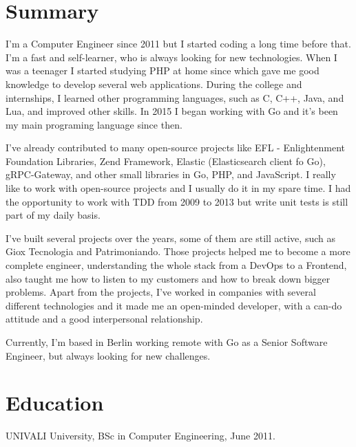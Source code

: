 \documentclass[margin]{res}
\begin{document}
\address{Berlin, DE \\ xguiga@gmail.com \\ +49 (173) 979-9383}

\begin{resume}

\section{Summary}
I'm a Computer Engineer since 2011 but I started coding a long time before that. I'm a fast and self-learner, who is always looking for new technologies. When I was a teenager I started studying PHP at home since which gave me good knowledge to develop several web applications. During the college and internships, I learned other programming languages, such as C, C++, Java, and Lua, and improved other skills. In 2015 I began working with Go and it's been my main programing language since then.

I've already contributed to many open-source projects like EFL - Enlightenment Foundation Libraries, Zend Framework, Elastic (Elasticsearch client fo Go), gRPC-Gateway, and other small libraries in Go, PHP, and JavaScript. I really like to work with open-source projects and I usually do it in my spare time. I had the opportunity to work with TDD from 2009 to 2013 but write unit tests is still part of my daily basis.

I've built several projects over the years, some of them are still active, such as Giox Tecnologia and Patrimoniando. Those projects helped me to become a more complete engineer, understanding the whole stack from a DevOps to a Frontend, also taught me how to listen to my customers and how to break down bigger problems. Apart from the projects, I've worked in companies with several different technologies and it made me an open-minded developer, with a can-do attitude and a good interpersonal relationship.

Currently, I'm based in Berlin working remote with Go as a Senior Software Engineer, but always looking for new challenges.

\section{Education} UNIVALI University, BSc in Computer Engineering, June 2011.


\end{resume}
\end{document}
